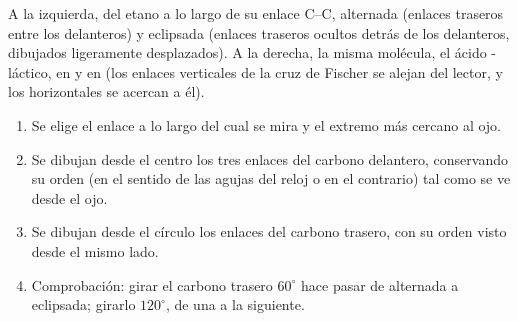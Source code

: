 \begin{omfigure}

{\small A la izquierda,  del etano a lo largo de su
enlace C--C, alternada (enlaces traseros entre los delanteros) y
eclipsada (enlaces traseros ocultos detrás de los delanteros, dibujados
ligeramente desplazados). A la derecha, la misma molécula, el ácido
-láctico, en  y en 
(los enlaces verticales de la cruz de Fischer se alejan del lector, y los
horizontales se acercan a él).}
\end{omfigure}

\begin{method}\label{met:b1:stereochemistry-in-depth:newman-from-cram}
\begin{enumerate}
  \item Se elige el enlace a lo largo del cual se mira y el extremo más
        cercano al ojo.
  \item Se dibujan desde el centro los tres enlaces del carbono
        delantero, conservando su orden (en el sentido de las agujas del
        reloj o en el contrario) tal como se ve desde el ojo.
  \item Se dibujan desde el círculo los enlaces del carbono trasero, con
        su orden visto desde el mismo lado.
  \item Comprobación: girar el carbono trasero $60^\circ$ hace pasar de
        alternada a eclipsada; girarlo $120^\circ$, de una  a la siguiente.
\end{enumerate}
\end{method}

